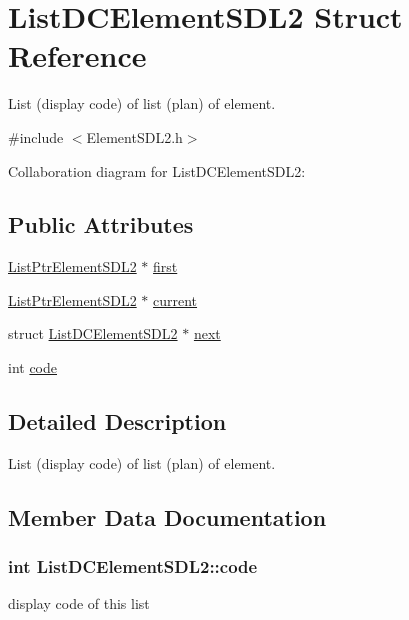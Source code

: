 \hypertarget{structListDCElementSDL2}{}\section{List\+D\+C\+Element\+S\+D\+L2 Struct Reference}
\label{structListDCElementSDL2}


List (display code) of list (plan) of element.  




{\ttfamily \#include $<$Element\+S\+D\+L2.\+h$>$}



Collaboration diagram for List\+D\+C\+Element\+S\+D\+L2\+:
\subsection*{Public Attributes}
\begin{DoxyCompactItemize}
\item 
\hyperlink{structListPtrElementSDL2}{List\+Ptr\+Element\+S\+D\+L2} $\ast$ \hyperlink{structListDCElementSDL2_a4226f765c0678e4e7cb79638eac95f35}{first}
\item 
\hyperlink{structListPtrElementSDL2}{List\+Ptr\+Element\+S\+D\+L2} $\ast$ \hyperlink{structListDCElementSDL2_a1e39f2362d4eb953baec5eeaa7d6d8fd}{current}
\item 
struct \hyperlink{structListDCElementSDL2}{List\+D\+C\+Element\+S\+D\+L2} $\ast$ \hyperlink{structListDCElementSDL2_a4b3b553c3ea6251594c4ab955da356a5}{next}
\item 
int \hyperlink{structListDCElementSDL2_a163353bf8dd3530a525f51abd703be1d}{code}
\end{DoxyCompactItemize}


\subsection{Detailed Description}
List (display code) of list (plan) of element. 

\subsection{Member Data Documentation}
\subsubsection[{\texorpdfstring{code}{code}}]{\setlength{\rightskip}{0pt plus 5cm}int List\+D\+C\+Element\+S\+D\+L2\+::code}\hypertarget{structListDCElementSDL2_a163353bf8dd3530a525f51abd703be1d}{}\label{structListDCElementSDL2_a163353bf8dd3530a525f51abd703be1d}
display code of this list 
